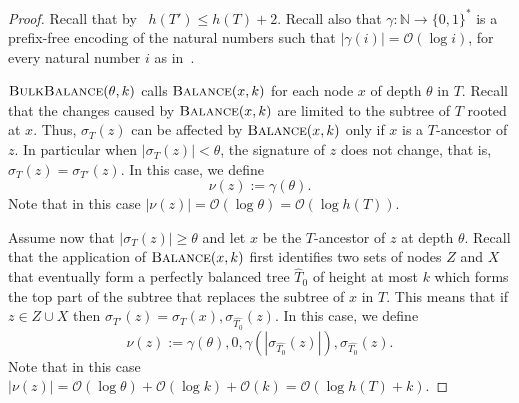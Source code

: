 \documentclass[kpfonts]{patmorin}
\newcommand{\Oh}{\mathcal{O}}
\let\leq\leqslant
\let\geq\geqslant
\begin{document}
\begin{proof}
  Recall that by~ $h(T') \leq h(T)+2$. 
  Recall also that $\gamma:\mathbb{N}\to\{0,1\}^*$ is a prefix-free encoding of the natural numbers such that $|\gamma(i)|=\Oh(\log i)$, for every natural number $i$ as in~. 

  $\textsc{BulkBalance}(\theta,k)$ calls $\textsc{Balance}(x,k)$ for each node $x$ of depth $\theta$  in $T$.
  Recall that the changes caused by $\textsc{Balance}(x,k)$ are limited to the subtree of $T$ rooted at $x$.
  Thus, $\sigma_{T}(z)$ can be affected by $\textsc{Balance}(x,k)$ only if $x$ is a $T$-ancestor of $z$.
  In particular when $|\sigma_{T}(z)| < \theta$, the signature of $z$ does not change, that is, $\sigma_{T}(z)=\sigma_{T'}(z)$. In this case,  we define
  \[
  \nu(z):=\gamma(\theta).
  \]
  Note that in this case $|\nu(z)|=\Oh(\log\theta) = \Oh(\log h(T))$.

  Assume now that $|\sigma_{T}(z)| \geq \theta$ and let $x$ be the $T$-ancestor of $z$ at depth $\theta$.
  Recall that the application of $\textsc{Balance}(x,k)$ first identifies two sets of nodes $Z$ and $X$ that eventually form a perfectly balanced tree $\hat{T}_0$ of height at most $k$ which forms the top part of the subtree that replaces the subtree of $x$ in $T$.
  This means that if $z\in Z\cup X$ then $\sigma_{T'}(z) = \sigma_{T}(x),\sigma_{\hat{T_0}}(z)$.
  In this case, we define 
  \[
  \nu(z):=\gamma(\theta),0,\gamma(|\sigma_{\hat{T_0}}(z)|),\sigma_{\hat{T_0}}(z).
  \]
  Note that in this case $|\nu(z)|=\Oh(\log\theta) + \Oh(\log k) + \Oh(k) = \Oh(\log h(T) + k)$.


\end{proof}
\end{document}
